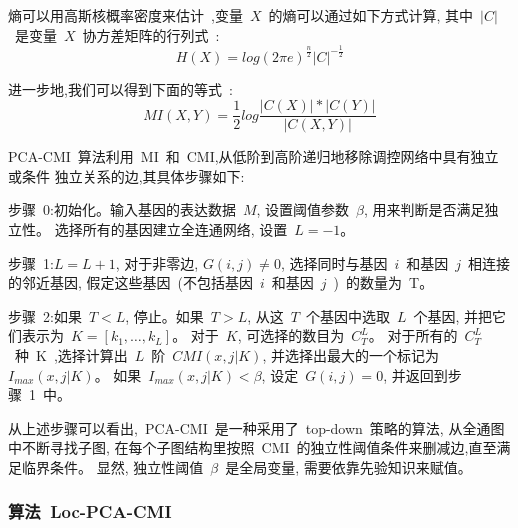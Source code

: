 熵可以用高斯核概率密度来估计~\cite{basso2005reverse},变量~$X$~的熵可以通过如下方式计算, 
其中~$|C|$~是变量~$X$~协方差矩阵的行列式~\cite{zhang2011inferring}:
\begin{equation}
    H(X) = log(2\pi e )^\frac{n}{2} |C| ^ {-\frac{1}{2}}
\end{equation}

进一步地,我们可以得到下面的等式~\cite{zhang2011inferring}:
\begin{equation}
    MI(X,Y)=\frac{1}{2}log\frac{|C(X)|*|C(Y)|}{|C(X,Y)|}
\end{equation}

PCA-CMI~算法利用~MI~和~CMI,从低阶到高阶递归地移除调控网络中具有独立或条件
独立关系的边,其具体步骤如下:

步骤~0:初始化。输入基因的表达数据~$M$, 设置阈值参数~$\beta$, 用来判断是否满足独立性。
选择所有的基因建立全连通网络, 设置~$L=-1$。

步骤~1:$L=L+1$, 对于非零边, $G(i,j) \neq 0$, 选择同时与基因~$i$~和基因~$j$~相连接的邻近基因, 
假定这些基因~(不包括基因~$i$~和基因~$j$~)~的数量为~T。

步骤~2:如果~$T<L$, 停止。如果~$T>L$, 从这~$T$~个基因中选取~$L$~个基因, 
并把它们表示为~$K=[k_1,\ldots,k_L]$。
对于~$K$, 可选择的数目为~$C_T^L$。
对于所有的~$C_T^L$~种~K~,选择计算出~$L$~阶~$CMI(x,j|K)$,
并选择出最大的一个标记为~$I_{max}(x,j|K)$。
如果~$I_{max}(x,j|K) < \beta$, 设定~$G(i,j)=0$, 并返回到步骤~1~中。

从上述步骤可以看出,~PCA-CMI~是一种采用了~top-down~策略的算法, 
从全通图中不断寻找子图, 在每个子图结构里按照~CMI~的独立性阈值条件来删减边,直至满足临界条件。
显然, 独立性阈值~$\beta$~是全局变量, 
需要依靠先验知识来赋值。

\subsubsection{算法~Loc-PCA-CMI}

